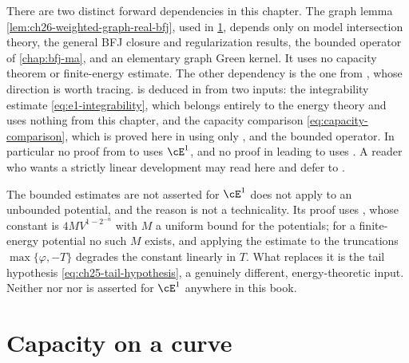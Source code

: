 \begin{remark}
\label{rem:ch25-no-circularity}
There are two distinct forward dependencies in this chapter.
The graph lemma \cref{lem:ch26-weighted-graph-real-bfj}, used in
\cref{sec:ch25-curves}, depends only on model intersection theory,
the general BFJ closure and regularization results, the bounded operator
of \cref{chap:bfj-ma}, and an elementary graph Green kernel.
It uses no capacity theorem or finite-energy estimate.
The other dependency is the one from ,
whose direction is worth tracing.   is deduced in
 from two inputs: the integrability estimate
\eqref{eq:e1-integrability}, which belongs entirely to the energy theory and
uses nothing from this chapter, and the capacity comparison
\eqref{eq:capacity-comparison}, which is proved here in
 using only
,
 and the bounded operator.  In
particular no proof from  to
 uses \(\cE^1\), and no proof in
 leading to  uses
.  A reader who wants a strictly linear
development may read  here and
defer  to .
\end{remark}

\begin{warning}{The bounded estimates are not asserted for
\texorpdfstring{$\cE^1$}{E1}}
 does not apply to an unbounded potential,
and the reason is not a technicality.  Its proof uses
, whose constant is
\(4MV^{1-2^{-n}}\) with \(M\) a uniform bound for the potentials; for a
finite-energy potential no such \(M\) exists, and applying the estimate to
the truncations \(\max\{\varphi,-T\}\) degrades the constant linearly in
\(T\).  What replaces it is the tail hypothesis
\eqref{eq:ch25-tail-hypothesis}, a genuinely different, energy-theoretic
input.  Neither  nor
 nor
 is asserted for \(\cE^1\)
anywhere in this book.
\end{warning}

\section{Capacity on a curve}
\label{sec:ch25-curves}

